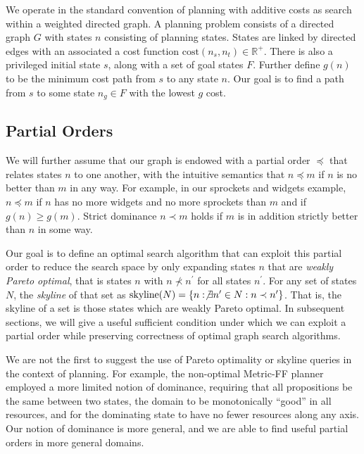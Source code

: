 \documentclass[letterpaper]{article}
\theoremstyle{plain} \newtheorem{theorem}{Theorem} \newtheorem{proposition}{Proposition} \newtheorem{lemma}{Lemma}
\theoremstyle{definition} \newtheorem{definition}{Definition} \newtheorem{conjecture}{Conjecture} \newtheorem*{example}{Example}
\theoremstyle{remark} \newtheorem*{remark}{Remark} \newtheorem*{note}{Note} \newtheorem{case}{Case}
\begin{document}
We operate in the standard convention of planning with additive
costs as search within a weighted directed graph.  A planning problem
consists of a directed graph $G$ with states $n$ consisting of
planning states.  States are linked by directed edges with an
associated a cost function $\mathrm{cost}(n_s,n_t) \in \mathbb R^+$.
There is also a privileged initial state $s$, along with a set of
goal states $F$.  Further define $g(n)$ to be the minimum cost path
from $s$ to any state $n$.  Our goal is to find a path from $s$ to
some state $n_g \in F$ with the lowest $g$ cost.


\subsection{Partial Orders}

We will further assume that our graph is endowed with a partial order $\preceq$
that relates states $n$ to one another, with the intuitive semantics that
$n \preceq m$ if $n$ is no better than $m$ in any way. For example, in
our sprockets and widgets example, $n \preceq m$ if $n$ has no more widgets and
no more sprockets than $m$ and if $g(n) \ge g(m)$. Strict dominance $n \prec m$
holds if $m$ is in addition strictly better than $n$ in some way.

Our goal is to define an optimal search algorithm that can exploit
this partial order to reduce the search space by only expanding
states $n$ that are \textit{weakly Pareto optimal}, that is states
$n$ with $n \nprec n^\prime$ for all states $n^\prime$. For any set
of states $N$, the \textit{skyline} of that set as
$\textrm{skyline}(N)=\{n: \not\exists n^\prime \in N: n \prec
n^\prime\}$. That is, the skyline of a set is those states which
are weakly Pareto optimal.  In subsequent sections, we will give a
useful sufficient condition under which we can exploit a partial
order while preserving correctness of optimal graph search algorithms.

We are not the first to suggest the use of Pareto optimality or
skyline queries in the context of planning. For example, the
non-optimal Metric-FF planner~\cite{hoffmann2003metric} employed a
more limited notion of dominance, requiring that all propositions
be the same between two states, the domain to be monotonically
``good'' in all resources, and for the dominating state to have no
fewer resources along any axis. Our notion of dominance is more
general, and we are able to find useful partial orders in more general
domains.
\end{document}

